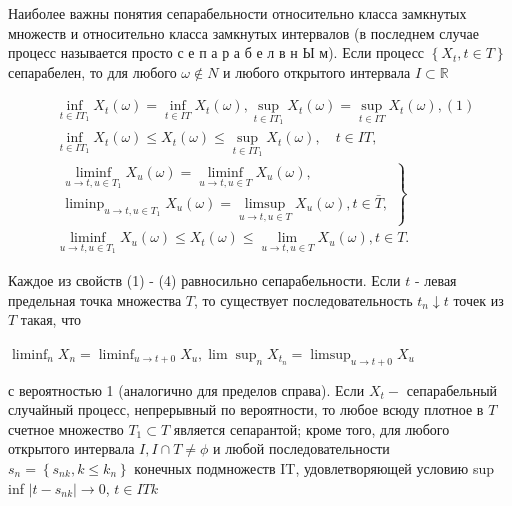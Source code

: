 \documentclass[10pt]{article}
\begin{document}
Наиболее важны понятия сепарабельности относительно класса замкнутых множеств и относительно класса замкнутых интервалов (в последнем случае процесс называется просто с е п а р а б е л в н Ы м). Если процесс $\left\{X_{t}, t \in T\right\}$ сепарабелен, то для любого $\omega \notin N$ и любого открытого интервала $I \subset \mathbb{R}$



\[

\begin{aligned}

& \inf _{t \in I T_{1}} X_{t}(\omega)=\inf _{t \in I T} X_{t}(\omega), \sup _{t \in I T_{1}} X_{t}(\omega)=\sup _{t \in I T} X_{t}(\omega),(1) \\

& \inf _{t \in I T_{1}} X_{t}(\omega) \leqslant X_{t}(\omega) \leqslant \sup _{t \in I T_{1}} X_{t}(\omega), \quad t \in I T, \\

& \left.\begin{array}{l}

\liminf _{u \rightarrow t, u \in T_{1}} X_{u}(\omega)=\liminf _{u \rightarrow t, u \in T} X_{u}(\omega), \\

\operatorname{liminp}_{u \rightarrow t, u \in T_{1}} X_{u}(\omega)=\limsup _{u \rightarrow t, u \in T} X_{u}(\omega), t \in \bar{T},

\end{array}\right\} \\

& \liminf _{u \rightarrow t, u \in T_{1}} X_{u}(\omega) \leqslant X_{t}(\omega) \leqslant \lim _{u \rightarrow t, u \in T} X_{u}(\omega), t \in T .

\end{aligned}

\]



Каждое из свойств (1) - (4) равносильно сепарабельности. Если $t$ - левая предельная точка множества $T$, то существует последовательность $t_{n} \downarrow t$ точек из $T$ такая, что



$\liminf _{n} X_{n}=\liminf _{u \rightarrow t+0} X_{u}, \lim \sup _{n} X_{t_{n}}=\limsup _{u \rightarrow t+0} X_{u}$



с вероятностью 1 (аналогично для пределов справа). Если $X_{t}-$ сепарабельный случайный процесс, непрерывный по вероятности, то любое всюду плотное в $T$ счетное множество $T_{1} \subset T$ является сепарантой; кроме того, для любого открытого интервала $I, I \cap T \neq \phi$ и любой последовательности $s_{n}=\left\{s_{n k}, k \leqslant k_{n}\right\}$ конечных подмножеств IT, удовлетворяющей условию sup inf $\left|t-s_{n k}\right| \rightarrow 0$, $t \in I T k$
\end{document}
